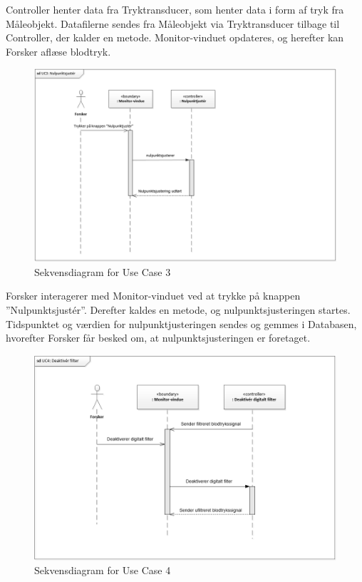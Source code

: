 Controller henter data fra Tryktransducer, som henter data i form af tryk fra Måleobjekt. Datafilerne sendes fra Måleobjekt via Tryktransducer tilbage til Controller, der kalder en metode. Monitor-vinduet opdateres, og herefter kan Forsker aflæse blodtryk. 

\begin{figure}[H]
	\centering
	\includegraphics[width=1\textwidth]{Figurer/UC3_SD}
	\caption{Sekvensdiagram for Use Case 3}
\end{figure}

Forsker interagerer med Monitor-vinduet ved at trykke på knappen ”Nulpunktsjustér”. Derefter kaldes en metode, og nulpunktsjusteringen startes. Tidspunktet og værdien for nulpunktjusteringen sendes og gemmes i Databasen, hvorefter Forsker får besked om, at nulpunktsjusteringen er foretaget. 

\begin{figure}[H]
	\centering
	\includegraphics[width=1\textwidth]{Figurer/UC4_SD}
	\caption{Sekvensdiagram for Use Case 4}
\end{figure}

